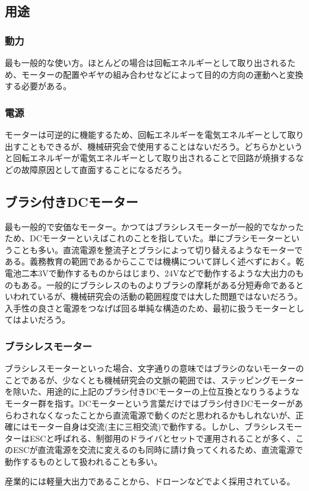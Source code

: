 \documentclass[a4paper,titlepage,here]{ujarticle}
\begin{document}
\subsection{用途}
\subsubsection{動力}
最も一般的な使い方。ほとんどの場合は回転エネルギーとして取り出されるため、モーターの配置やギヤの組み合わせなどによって目的の方向の運動へと変換する必要がある。
\subsubsection{電源}
モーターは可逆的に機能するため、回転エネルギーを電気エネルギーとして取り出すこともできるが、機械研究会で使用することはないだろう。どちらかというと回転エネルギーが電気エネルギーとして取り出されることで回路が焼損するなどの故障原因として直面することになるだろう。
\subsection{ブラシ付きDCモーター}
最も一般的で安価なモーター。かつてはブラシレスモーターが一般的でなかったため、DCモーターといえばこれのことを指していた。単にブラシモーターということも多い。直流電源を整流子とブラシによって切り替えるようなモーターである。義務教育の範囲であるからここでは機構について詳しく述べずにおく。乾電池二本3Vで動作するものからはじまり、24Vなどで動作するような大出力のものもある。一般的にブラシレスのものよりブラシの摩耗がある分短寿命であるといわれているが、機械研究会の活動の範囲程度では大した問題ではないだろう。入手性の良さと電源をつなげば回る単純な構造のため、最初に扱うモーターとしてはよいだろう。
\subsubsection{ブラシレスモーター}
ブラシレスモーターといった場合、文字通りの意味ではブラシのないモーターのことであるが、少なくとも機械研究会の文脈の範囲では、ステッピングモーターを除いた、用途的に上記のブラシ付きDCモーターの上位互換となりうるようなモーター群を指す。DCモーターという言葉だけではブラシ付きDCモーターがあらわされなくなったことから直流電源で動くのだと思われるかもしれないが、正確にはモーター自身は交流(主に三相交流)で動作する。しかし、ブラシレスモーターはESCと呼ばれる、制御用のドライバとセットで運用されることが多く、このESCが直流電源を交流に変えるのも同時に請け負ってくれるため、直流電源で動作するものとして扱われることも多い。

産業的には軽量大出力であることから、ドローンなどでよく採用されている。
\end{document}
